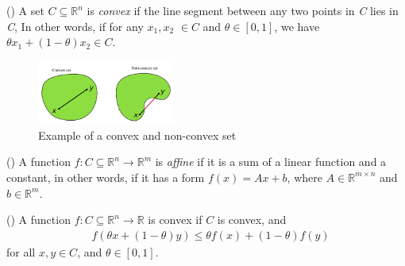 \begin{definition}
(\cite[23]{boyd2004convex})
A set $C \subseteq \mathbb{R}^{n}$ is \textit{convex} if the line segment between any two points in \textit{C} lies in \textit{C}, In other words, if for any $x_{1}, x_{2}$ $\in C$ and $\theta\in [0,1]$, we have $\theta x_{1} + (1-\theta) x_{2} \in C.$
\end{definition}
\vspace*{0pt}
\begin{figure}[h!]
    \centering
        \includegraphics[width=0.4\textwidth]{Pictures/Convex ex.png}
    \caption{Example of a convex and non-convex set}
    \label{fig:conv-nonconv}
\end{figure}

\begin{definition}
(\cite[36]{boyd2004convex})
A function $f:C\subseteq\mathbb{R}^{n} \longrightarrow \mathbb{R}^m$ is \textit{affine} if it is a sum of a linear function and a constant, in other words, if it has a form $f(x) = Ax + b$, where $A \in \mathbb{R}^{m \times n}$ and $b \in \mathbb{R}^m$.
\end{definition}

\begin{definition}\label{definition.2.4}
(\cite[67]{boyd2004convex})
A function $f: C\subseteq\mathbb{R}^{n} \longrightarrow \mathbb{R}$ is convex if $C$ is  convex, and
\begin{equation*}\label{eq:4}\tag{3.1.1}
\begin{aligned}
    &f(\theta x + (1-\theta) y) \leq \theta f(x) + (1-\theta) f(y)
\end{aligned}
\end{equation*}
for all $x,y \in C$, and $\theta\in [0,1].$
\end{definition}

